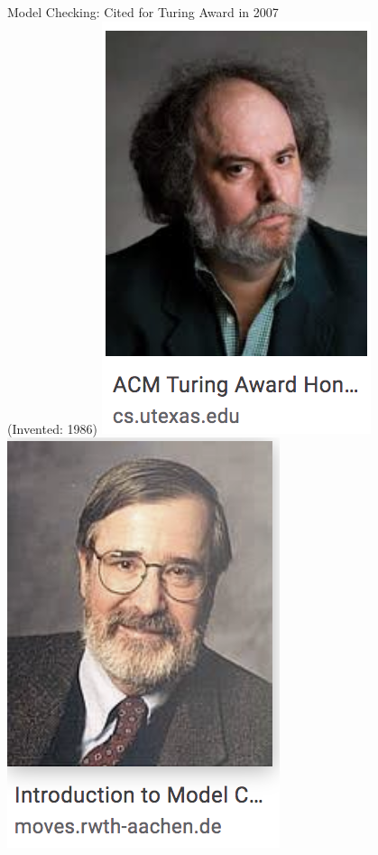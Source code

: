 \documentclass{beamer}
\begin{document}
\begin{frame}{Model Checking: Cited for Turing Award in 2007 \\
(Invented: 1986)}
\includegraphics[scale=0.4]{pics/allen.png}\hfill
\includegraphics[scale=0.4]{pics/clarke.png}\hfill

\end{frame}
\end{document}
